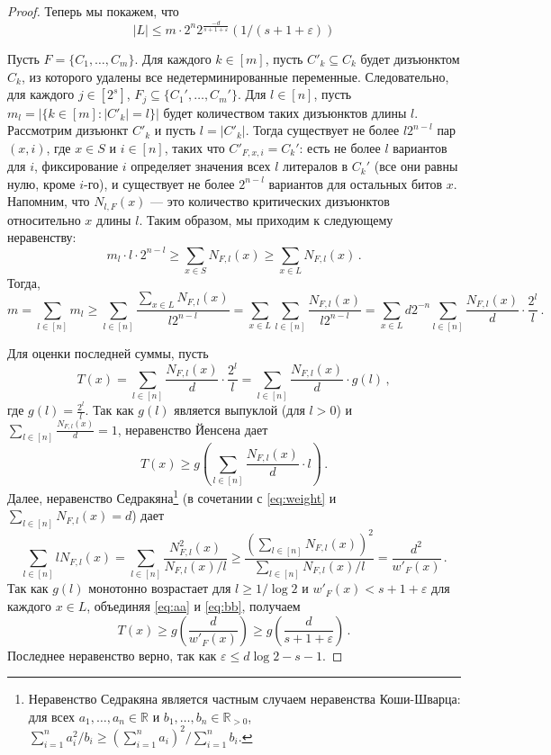 \begin{proof}
	Теперь мы покажем, что  
	\begin{equation}\label{eq:L}
		|L| \le m \cdot 2^{n}2^{\frac{-d}{s+1+\varepsilon}}(1/(s+1+\varepsilon))
	\end{equation}
	
	
	Пусть $F=\{C_1, \dotsc, C_m\}$. Для каждого $k \in [m]$, пусть $C'_k \subseteq C_k$
	будет дизъюнктом $C_k$, из которого удалены все недетерминированные переменные. Следовательно, для каждого
	$j \in [2^s]$, $F_j \subseteq \{C_1', \dotsc, C_m'\}$. Для $l \in [n]$,
	пусть $m_l=|\{k \in [m] \colon |C'_k|=l\}|$ будет количеством таких дизъюнктов длины $l$.
	Рассмотрим дизъюнкт $C'_k$
	и пусть $l=|C'_k|$. Тогда существует не более $l2^{n-l}$ пар $(x,i)$,
	где $x \in S$ и $i \in [n]$, таких что $C'_{F,x,i}=C_k'$:
	есть не более $l$ вариантов для $i$, фиксирование $i$ определяет значения
	всех $l$ литералов в $C_k'$ (все они равны нулю, кроме $i$-го), и существует не более $2^{n-l}$ вариантов для остальных битов $x$.
	Напомним, что $N_{l,F}(x)$ — это количество критических дизъюнктов относительно $x$
	длины $l$. Таким образом, мы приходим к следующему неравенству:
	\[m_l \cdot l \cdot 2^{n - l} \ge \sum_{x \in S} N_{F,l}(x) \ge \sum_{x \in L} N_{F,l}(x) \, .\]
	Тогда,
	\begin{equation}\label{eq:cc}
		m =\sum_{l \in [n]}m_l \ge \sum_{l \in [n]}\frac{\sum_{x \in L} N_{F,l}(x)}{l2^{n-l}}=
		\sum_{x \in L} \sum_{l \in [n]} \frac{N_{F,l}(x)}{l2^{n-l}} =
		\sum_{x \in L} d2^{-n} \sum_{l \in [n]} \frac{N_{F,l}(x)}{d} \cdot \frac{2^l}{l} \, .
	\end{equation}
	
	
	Для оценки последней суммы, пусть
	\[T(x)=\sum_{l \in [n]} \frac{N_{F,l}(x)}{d} \cdot \frac{2^l}{l}=\sum_{l \in [n]} \frac{N_{F,l}(x)}{d}\cdot g(l)\,,\]
	где $g(l) = \frac{2^l}{l}$. Так как $g(l)$ является выпуклой (для $l>0$) и $\sum_{l \in [n]}\frac{N_{F,l}(x)}{d}=1$, неравенство Йенсена дает
	\begin{equation}\label{eq:aa}
		T(x) \ge g\left(\sum_{l \in [n]} \frac{N_{F,l}(x)}{d}\cdot l\right) \, .
	\end{equation}
	Далее, неравенство Седракяна\footnote{Неравенство Седракяна является частным случаем неравенства Коши-Шварца: для всех $a_1, \dotsc, a_n \in \mathbb R$ и $b_1, \dotsc, b_n \in \mathbb{R}_{>0}$, $\sum_{i=1}^n a_i^2/b_i \ge \left(\sum_{i=1}^n a_i\right)^2/\sum_{i=1}^n b_i$.} (в сочетании с \eqref{eq:weight} и $\sum_{l \in [n]}N_{F,l}(x)=d$) дает
	\begin{equation}\label{eq:bb}
		\sum_{l \in [n]} l N_{F,l}(x) = \sum_{l \in [n]} \frac{N_{F,l}^2(x)}{N_{F,l}(x) / l} \ge \frac{(\sum_{l \in [n]} N_{F,l}(x))^2}{\sum_{l \in [n]} N_{F,l}(x) / l} = \frac{d^2}{w'_F(x)} \, .
	\end{equation}
	Так как $g(l)$ монотонно возрастает для $l \ge 1/\log 2$ и $w'_F(x)<s+1+\varepsilon$ для каждого $x \in L$,
	объединяя \eqref{eq:aa} и \eqref{eq:bb}, получаем
	\begin{equation}\label{eq:tx}
		T(x) \ge g \left( \frac{d}{w'_F(x)}\right) \ge g \left( \frac{d}{s+1+\varepsilon}\right) \, .
	\end{equation}
	Последнее неравенство верно, так как $\varepsilon \le d \log 2 - s - 1$. 
	

\end{proof}
